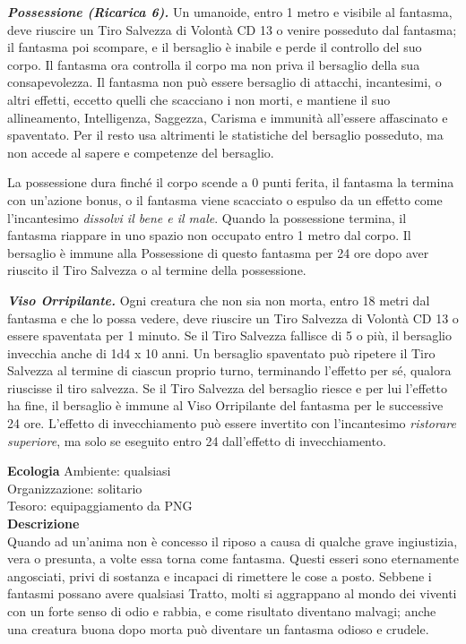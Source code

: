 \begin{multicols}{2}
\emph{\textbf{Possessione (Ricarica 6).}} Un umanoide, entro 1 metro e visibile al fantasma, deve riuscire un Tiro Salvezza di Volontà CD 13 o venire posseduto dal fantasma; il fantasma poi scompare, e il bersaglio è inabile e perde il controllo del suo corpo. Il fantasma ora controlla il corpo ma non priva il bersaglio della sua consapevolezza. Il fantasma non può essere bersaglio di attacchi, incantesimi, o altri effetti, eccetto quelli che scacciano i non morti, e mantiene il suo allineamento, Intelligenza, Saggezza, Carisma e immunità all'essere affascinato e spaventato. Per il resto usa altrimenti le statistiche del bersaglio posseduto, ma non accede al sapere e competenze del bersaglio.

La possessione dura finché il corpo scende a 0 punti ferita, il fantasma la termina con un'azione bonus, o il fantasma viene scacciato o espulso da un effetto come l'incantesimo \emph{dissolvi il bene e il male}. Quando la possessione termina, il fantasma riappare in uno spazio non occupato entro 1 metro dal corpo. Il bersaglio è immune alla Possessione di questo fantasma per 24 ore dopo aver riuscito il Tiro Salvezza o al termine della possessione.

\emph{\textbf{Viso Orripilante.}} Ogni creatura che non sia non morta, entro 18 metri dal fantasma e che lo possa vedere, deve riuscire un Tiro Salvezza di Volontà CD 13 o essere spaventata per 1 minuto. Se il Tiro Salvezza fallisce di 5 o più, il bersaglio invecchia anche di 1d4 x 10 anni. Un  bersaglio spaventato può ripetere il Tiro Salvezza al termine di ciascun proprio turno, terminando l'effetto per sé, qualora riuscisse il tiro  salvezza. Se il Tiro Salvezza del bersaglio riesce e per lui l'effetto ha fine, il bersaglio è immune al Viso Orripilante del fantasma per le successive 24  ore. L'effetto di invecchiamento può essere invertito con l'incantesimo \emph{ristorare superiore}, ma solo se eseguito entro 24 dall'effetto di  invecchiamento.

\textbf{Ecologia}
Ambiente: qualsiasi\\
Organizzazione: solitario\\
Tesoro: equipaggiamento da PNG\\
\textbf{Descrizione}\\
Quando ad un'anima non è concesso il riposo a causa di qualche grave ingiustizia, vera o presunta, a volte essa torna come fantasma. Questi esseri sono eternamente angosciati, privi di sostanza e incapaci di rimettere le cose a posto. Sebbene i fantasmi possano avere qualsiasi Tratto, molti si aggrappano al mondo dei viventi con un forte senso di odio e rabbia, e come risultato diventano  malvagi; anche una creatura buona dopo morta può diventare un fantasma odioso e crudele.\\


\end{multicols}
